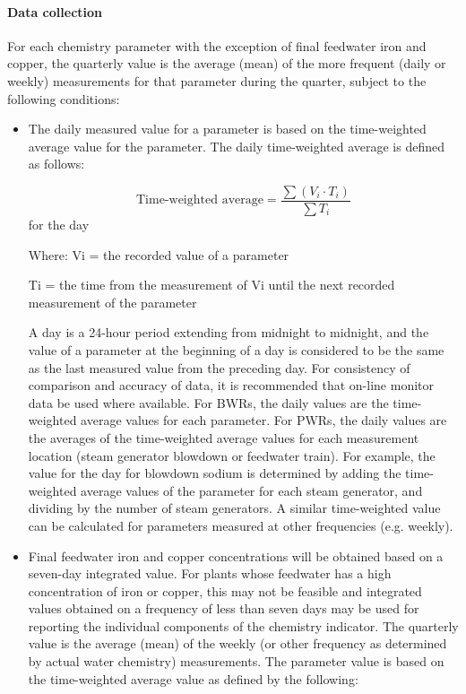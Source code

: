 \paragraph{Data collection}

For each chemistry parameter with the exception of final feedwater
iron and copper, the quarterly value is the average (mean) of the more
frequent (daily or weekly) measurements for that parameter during the
quarter, subject to the following conditions:
\begin{itemize}
\item The daily measured value for a parameter is based on the time-weighted
average value for the parameter. The daily time-weighted average is
defined as follows:

$$ \text{Time-weighted average} = \frac{\sum{(V_i \cdot T_i)}}{\sum{T_i}} $$ for the day

Where:	Vi =	the recorded value of a parameter

Ti  = 	the time from the measurement of Vi until the next recorded
measurement of the parameter

A day is a 24-hour period extending from midnight to midnight, and the
value of a parameter at the beginning of a day is considered to be the
same as the last measured value from the preceding day. For
consistency of comparison and accuracy of data, it is recommended that
on-line monitor data be used where available. For BWRs, the daily
values are the time-weighted average values for each parameter. For
PWRs, the daily values are the averages of the time-weighted average
values for each measurement location (steam generator blowdown or
feedwater train). For example, the value for the day for blowdown
sodium is determined by adding the time-weighted average values of the
parameter for each steam generator, and dividing by the number of
steam generators. A similar time-weighted value can be calculated for
parameters measured at other frequencies (e.g. weekly).

\item Final feedwater iron and copper concentrations will be obtained
  based on a seven-day integrated value. For plants whose feedwater
  has a high concentration of iron or copper, this may not be feasible
  and integrated values obtained on a frequency of less than seven
  days may be used for reporting the individual components of the
  chemistry indicator. The quarterly value is the average (mean) of
  the weekly (or other frequency as determined by actual water
  chemistry) measurements. The parameter value is based on the
  time-weighted average value as defined by the following:


\end{itemize}
